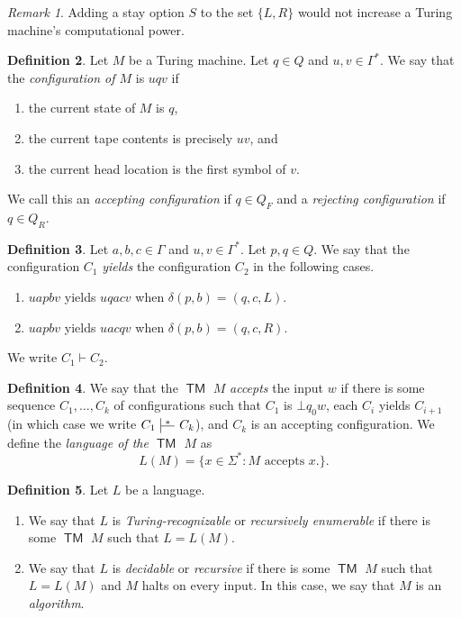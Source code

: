 \documentclass[10pt,letterpaper,cm]{nupset}
\theoremstyle{definition}
\newtheorem{definition}{Definition}[subsection]
\theoremstyle{theorem}
\theoremstyle{remark}
\newtheorem{remark}[definition]{Remark}
\def\ruleoffset{1pt}
\newcommand\specialvdash[2]{\mathrel{\ensurestackMath{
  \mkern2mu\rule[-\dp\strutbox]{.4pt}{\baselineskip}\stackon[\ruleoffset]{
    \stackunder[\dimexpr\ruleoffset-.4\ht\strutbox+.4\dp\strutbox]{
      \rule[\dimexpr.4\ht\strutbox-.4\dp\strutbox]{2.5ex}{.4pt}}{
        \scriptstyle #1}}{\scriptstyle#2}\mkern2mu}}
}
\newcommand{\1}{\mathbf{1}}
\newcommand{\0}{\vec 0}
\DeclareMathOperator{\TM}{\mathsf{TM}}
\begin{document}
\begin{remark}
Adding a stay option $S$ to the set $\{L, R\}$ would not increase a Turing machine's computational power.
\end{remark}

\begin{definition}
Let $M$ be a Turing machine. Let $q\in Q$ and $u,v\in \Gamma^{\ast}$. We say that the \textit{configuration of $M$} is $uqv$ if 
\begin{enumerate}[label=(\alph*)]
\item the current state of $M$ is $q$,
\item the current tape contents is precisely $uv$, and
\item the current head location is the first symbol of $v$.
\end{enumerate}
We call this an \textit{accepting configuration} if $q \in Q_F$ and a \textit{rejecting configuration} if $q \in Q_R$.
\end{definition}

\begin{definition}
Let $a,b,c\in \Gamma$ and $u,v\in \Gamma^{\ast}$. Let $p,q\in Q$. We say that the configuration $C_1$ \textit{yields} the configuration $C_2$ in the following cases. 
\begin{enumerate}[label=(\alph*)]
\item $uapbv$ yields $uqacv$ when $\delta(p,b) = (q, c, L)$.
\item $uapbv$ yields $uacqv$ when $\delta(p, b) = (q, c, R)$. 
\end{enumerate}
We write $C_1 \vdash C_2$.
\end{definition}

\begin{definition}
We say that the $\TM$ $M$ \textit{accepts} the input $w$ if there is some sequence $C_1, \ldots, C_k$ of configurations such that $C_1$ is $\bot q_0w$, each $C_i$ yields $C_{i+1}$ (in which case we write $C_1 \specialvdash{}{*} C_k $), and $C_k$ is an accepting configuration.  We define the \textit{language of the $\TM$ $M$} as $$L(M) = \{x \in \Sigma^{\ast}: M \text{ accepts } x. \}.$$
\end{definition}

\begin{definition} Let $L$ be a language.
\begin{enumerate}
\item We say that $L$ is \textit{Turing-recognizable} or \textit{recursively enumerable} if there is some $\TM$ $M$ such that $L = L(M)$.
\item We say that $L$ is \textit{decidable} or \textit{recursive} if there is some $\TM$ $M$ such that $L= L(M)$ and $M$ halts on every input. In this case, we say that $M$ is an \textit{algorithm}.
\end{enumerate}
\end{definition}
\end{document}
